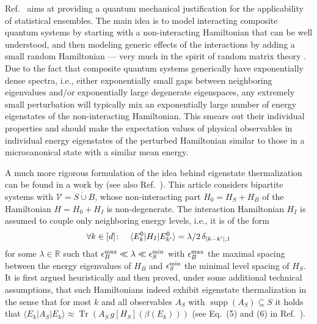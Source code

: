 \documentclass[a4paper,12pt,listof=totoc,index=totoc,bibliography=totoc,headsepline=false,headings=normal,BCOR16.153846mm,DIV12,headinclude,twoside,cleardoublepage=empty,numbers=noenddot,final]{scrreprt}
\theoremstyle{mystyle}
\numberwithin{equation}{section}
\numberwithin{figure}{section}
\numberwithin{lemma}{section}
\numberwithin{theorem}{section}
\numberwithin{corollary}{section}
\numberwithin{definition}{section}
\numberwithin{conjecture}{section}
\numberwithin{observation}{section}
\newcommand{\+}{\mkern2mu}
\newcommand{\dunion}{\mathbin{\dot{\cup}}}
\newcommand{\itholds}{\colon\mathchoice{\quad}{}{}{}}
\renewcommand{\max}{\mathchoice{\operatorname*{max}}{\operatorname*{max}}{\mathrm{max}}{\mathrm{max}}} %
\renewcommand{\min}{\mathchoice{\operatorname*{min}}{\operatorname*{min}}{\mathrm{min}}{\mathrm{min}}}
\newcommand{\levelspaceing}{\epsilon}
\renewcommand{\H}{H}
\newcommand{\Vset}{\mathcal{V}}
\newcommand{\bra}[1]{\langle #1|}
\newcommand{\ket}[1]{|#1\rangle}
\DeclareMathOperator{\1}{\mathds{1}}
\DeclareMathOperator{\Tr}{Tr}
\DeclareMathOperator{\supp}{supp}
\newcommand{\mb}[1]{\mathbb{#1}}
\newcommand{\R}{\mb{R}}
\begin{document}
Ref.~\cite{PhysRevE.50.88} aims at providing a quantum mechanical justification for the applicability of statistical ensembles.
The main idea is to model interacting composite quantum systems by starting with a non-interacting Hamiltonian that can be well understood, and then modeling generic effects of the interactions by adding a small random Hamiltonian --- very much in the spirit of random matrix theory \cite{Bohigas1984,Tao2012,mehta90}.
Due to the fact that composite quantum systems generically have exponentially dense spectra, i.e., either exponentially small gaps between neighboring eigenvalues and/or exponentially large degenerate eigenspaces, any extremely small perturbation will typically mix an exponentially large number of energy eigenstates of the non-interacting Hamiltonian.
This smears out their individual properties and should make the expectation values of physical observables in individual energy eigenstates of the perturbed Hamiltonian similar to those in a microcanonical state with a similar mean energy.

A much more rigorous formulation of the idea behind eigenstate thermalization can be found in a work by \textcite{tasaki98} (see also Ref.~\cite{Tasaki97}).
This article considers bipartite systems with $\Vset = S \dunion B$, whose non-interacting part $\H_0 = \H_S + \H_B$ of the Hamiltonian $\H = \H_0 + \H_I$ is non-degenerate.
The interaction Hamiltonian $\H_I$ is assumed to couple only neighboring energy levels, i.e., it is of the form
\begin{equation}
  \forall k\in[d]\itholds \bra{E^0_k} \H_I \ket{E^0_{k'}} = \lambda/2\,\delta_{|k-k'|,1} 
\end{equation}
for some $\lambda\in\R$ such that $\levelspaceing^{\max}_B \ll \lambda \ll \levelspaceing^{\min}_S$ with $\levelspaceing^{\max}_B$ the maximal spacing between the energy eigenvalues of $\H_B$ and $\levelspaceing^{\min}_S$ the minimal level spacing of $\H_S$.
It is first argued heuristically and then proved, under some additional technical assumptions, that such Hamiltonians indeed exhibit eigenstate thermalization in the sense that for most $k$ and all observables $A_S$ with $\supp(A_S) \subseteq S$ it holds that $\bra{E_k} A_S \ket{E_k} \approx \Tr(A_S\, g[H_S](\beta(E_k)))$ (see Eq.~(5) and (6) in Ref.~\cite{Tasaki97}).
\end{document}
